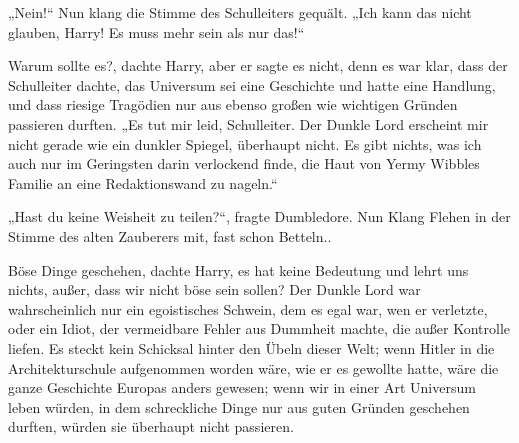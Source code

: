 „Nein!“ Nun klang die Stimme des Schulleiters gequält. „Ich kann das nicht glauben, Harry! Es muss mehr sein als nur das!“

Warum sollte es?, dachte Harry, aber er sagte es nicht, denn es war klar, dass der Schulleiter dachte, das Universum sei eine Geschichte und hatte eine Handlung, und dass riesige Tragödien nur aus ebenso großen wie wichtigen Gründen passieren durften. „Es tut mir leid, Schulleiter. Der Dunkle Lord erscheint mir nicht gerade wie ein dunkler Spiegel, überhaupt nicht. Es gibt nichts, was ich auch nur im Geringsten darin verlockend finde, die Haut von Yermy Wibbles Familie an eine Redaktionswand zu nageln.“

„Hast du keine Weisheit zu teilen?“, fragte Dumbledore. Nun Klang Flehen in der Stimme des alten Zauberers mit, fast schon Betteln..

Böse Dinge geschehen, dachte Harry, es hat keine Bedeutung und lehrt uns nichts, außer, dass wir nicht böse sein sollen? Der Dunkle Lord war wahrscheinlich nur ein egoistisches Schwein, dem es egal war, wen er verletzte, oder ein Idiot, der vermeidbare Fehler aus Dummheit machte, die außer Kontrolle liefen. Es steckt kein Schicksal hinter den Übeln dieser Welt; wenn Hitler in die Architekturschule aufgenommen worden wäre, wie er es gewollte hatte, wäre die ganze Geschichte Europas anders gewesen; wenn wir in einer Art Universum leben würden, in dem schreckliche Dinge nur aus guten Gründen geschehen durften, würden sie überhaupt nicht passieren.

